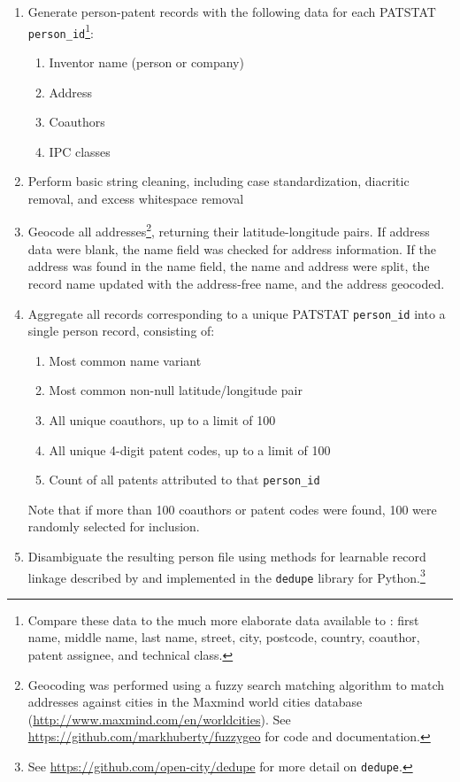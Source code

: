 \documentclass[11pt]{article}
\begin{document}
\begin{enumerate}
\item Generate person-patent records with the following
  data for each PATSTAT \texttt{person\_id}\footnote{Compare these data to the much more elaborate data available to
    \cite{lai2011disambiguation}: first name, middle name, last name,
    street, city, postcode, country, coauthor, patent assignee,
    and technical class.}:
  \begin{enumerate}
  \item Inventor name (person or company)
  \item Address
  \item Coauthors
  \item IPC classes
  \end{enumerate}
\item Perform basic string cleaning, including case standardization,
  diacritic removal, and excess whitespace removal
\item Geocode all addresses\footnote{Geocoding was performed using
    a fuzzy search matching algorithm to match addresses against
    cities in the Maxmind world cities
    database (\url{http://www.maxmind.com/en/worldcities}). See
    \url{https://github.com/markhuberty/fuzzygeo} for code and documentation.},
  returning their latitude-longitude pairs. 
  If address data were
  blank, the name field was checked for address information. If the
  address was found in the name field, the name and address were
  split, the record name updated with the address-free name, and the
  address geocoded.
\item Aggregate all records corresponding to a unique PATSTAT
  \texttt{person\_id} into a single person record, consisting of:
  \begin{enumerate}
  \item Most common name variant
  \item Most common non-null latitude/longitude pair
  \item All unique coauthors, up to a limit of 100
  \item All unique 4-digit patent codes, up to a limit of 100
  \item Count of all patents attributed to that \texttt{person\_id}
  \end{enumerate}
  Note that if more than 100 coauthors or patent codes were found, 100
  were randomly selected for inclusion.
\item Disambiguate the resulting person file using methods for learnable record linkage described
  by \cite{bilenko2006learnable} and implemented in the
  \texttt{dedupe} library for Python.\footnote{See
    \url{https://github.com/open-city/dedupe} for more detail on
    \texttt{dedupe}.} 
\end{enumerate}
\end{document}
